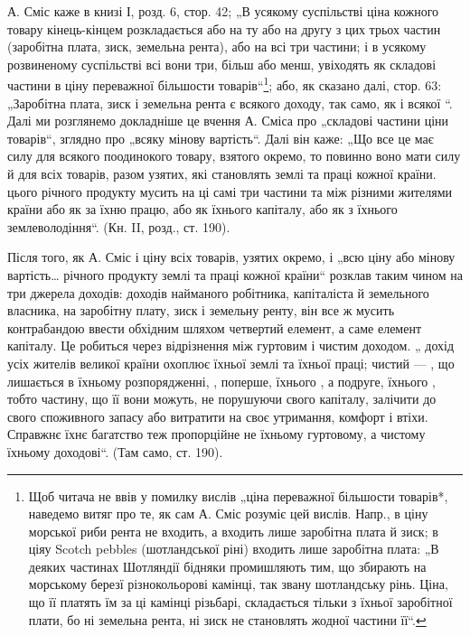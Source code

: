 А. Сміс каже в книзі І, розд. 6, стор. 42; „В усякому суспільстві
ціна кожного товару кінець-кінцем розкладається або на ту або на другу
з цих трьох частин (заробітна плата, зиск, земельна рента), або на всі
три частини; і в усякому розвиненому суспільстві всі вони три, більш
або менш, увіходять як складові частини в ціну переважної більшости
товарів“\footnote{
Щоб читача не ввів у помилку вислів „ціна переважної більшости товарів*,
наведемо витяг про те, як сам А. Сміс розуміє цей вислів. Напр., в ціну морської
риби рента не входить, а входить лише заробітна плата й зиск; в ціяу Scotch
pebbles (шотландської ріні) входить лише заробітна плата: „В деяких частинах
Шотляндії бідняки промишляють тим, що збирають на морському березї різнокольорові
камінці, так звану шотландську рінь. Ціна, що її платять їм за ці камінці
різьбарі, складається тільки з їхньої заробітної плати, бо ні земельна рента, ні
зиск не становлять жодної частини її“.
}; або, як сказано далі, стор. 63: „Заробітна плата, зиск і земельна
рента є  всякого доходу, так само,
як і всякої “. Далі ми розглянемо докладніше це
вчення А. Сміса про „складові частини ціни товарів“, зглядно про „всяку
мінову вартість“. Далі він каже: „Що все це має силу для всякого
поодинокого товару, взятого окремо, то повинно воно мати силу й для
всіх товарів, разом узятих, які становлять 
землі та праці кожної країни. 
цього річного продукту мусить  на ці самі три частини
та  між різними жителями країни або як  за
їхню працю, або як  їхнього капіталу, або як  з їхнього
землеволодіння“. (Кн. II, розд., ст. 190).

Після того, як А. Сміс і ціну всіх товарів, узятих окремо, і „всю ціну
або мінову вартість\dots{} річного продукту землі та праці кожної країни“
розклав таким чином на три джерела доходів: доходів найманого робітника,
капіталіста й земельного власника, на заробітну плату, зиск і земельну
ренту, він все ж мусить контрабандою ввести обхідним шляхом
четвертий елемент, а саме елемент капіталу. Це робиться через відрізнення
між гуртовим і чистим доходом. „ дохід усіх жителів великої
країни охоплює  їхньої землі та їхньої праці;
чистий  — , що лишається в їхньому розпорядженні,
, поперше, їхнього ,
а подруге, їхнього , тобто
частину, що її вони можуть, не порушуючи свого капіталу, залічити
до свого споживного запасу або витратити на своє утримання, комфорт
і втіхи. Справжнє їхнє багатство теж пропорційне не їхньому гуртовому,
а чистому їхньому доходові“. (Там само, ст. 190).

